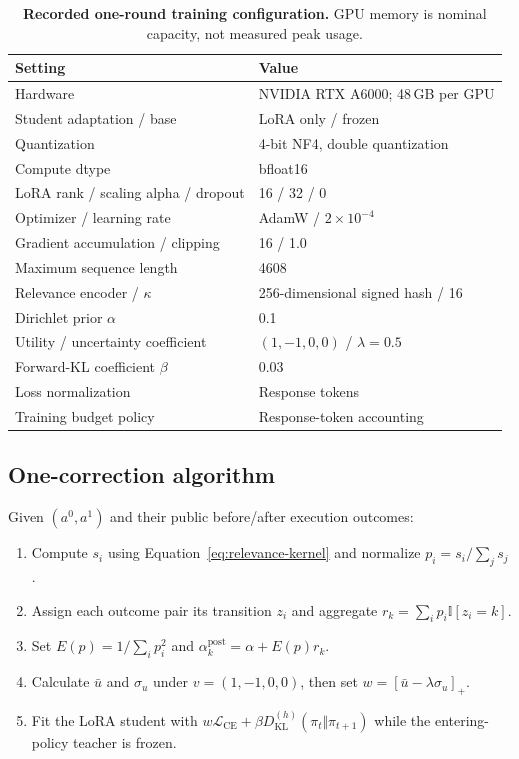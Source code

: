 \documentclass{article}
\newcommand{\ind}{\mathbb{I}}
\begin{document}
\begin{table}[htbp]
\centering
\small
\caption{\textbf{Recorded one-round training configuration.} GPU memory is nominal capacity, not measured peak usage.}
\setlength{\tabcolsep}{6pt}
\begin{tabular}{ll}
\toprule
Setting & Value \\
\midrule
Hardware & NVIDIA RTX A6000; 48\,GB per GPU \\
Student adaptation / base & LoRA only / frozen \\
Quantization & 4-bit NF4, double quantization \\
Compute dtype & bfloat16 \\
LoRA rank / scaling alpha / dropout & 16 / 32 / 0 \\
Optimizer / learning rate & AdamW / $2\times10^{-4}$ \\
Gradient accumulation / clipping & 16 / 1.0 \\
Maximum sequence length & 4608 \\
Relevance encoder / $\kappa$ & 256-dimensional signed hash / 16 \\
Dirichlet prior $\alpha$ & 0.1 \\
Utility / uncertainty coefficient & $(1,-1,0,0)$ / $\lambda=0.5$ \\
Forward-KL coefficient $\beta$ & 0.03 \\
Loss normalization & Response tokens \\
Training budget policy & Response-token accounting \\
\bottomrule
\end{tabular}
\label{tab:training-settings}
\end{table}

\subsection{One-correction algorithm}
\label{app:algorithm}

Given $(a^0,a^1)$ and their public before/after execution outcomes:
\begin{enumerate}
\item Compute $s_i$ using Equation~\ref{eq:relevance-kernel} and normalize $p_i=s_i/\sum_j s_j$.
\item Assign each outcome pair its transition $z_i$ and aggregate $r_k=\sum_i p_i\ind[z_i=k]$.
\item Set $E(p)=1/\sum_i p_i^2$ and $\alpha_k^{\mathrm{post}}=\alpha+E(p)r_k$.
\item Calculate $\bar u$ and $\sigma_u$ under $v=(1,-1,0,0)$, then set $w=[\bar u-\lambda\sigma_u]_+$.
\item Fit the LoRA student with $w\mathcal L_{\mathrm{CE}}+\beta D_{\mathrm{KL}}^{(h)}(\pi_t\Vert\pi_{t+1})$ while the entering-policy teacher is frozen.
\end{enumerate}
\end{document}
